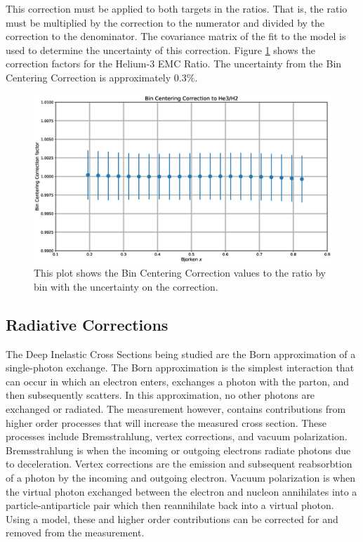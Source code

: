 This correction must be applied to both targets in the ratios. That is, the ratio must be multiplied by the correction to the numerator and divided by the correction to the denominator.\cite{wtsydp} The covariance matrix of the fit to the model is used to determine the uncertainty of this correction. Figure \ref{fig:bcc} shows the correction factors for the Helium-3 EMC Ratio. The uncertainty from the Bin Centering Correction is approximately $0.3\%$.

\begin{figure}
	\includegraphics[width=\textwidth]{./analysis/fig/bcc.eps}
	\caption{This plot shows the Bin Centering Correction values to the  ratio by bin with the uncertainty on the correction.}
	\label{fig:bcc}
\end{figure}

\subsection{Radiative Corrections}

The Deep Inelastic Cross Sections being studied are the Born approximation of a single-photon exchange. The Born approximation is the simplest interaction that can occur in which an electron enters, exchanges a photon with the parton, and then subsequently scatters. In this approximation, no other photons are exchanged or radiated. The measurement however, contains contributions from higher order processes that will increase the measured cross section. These processes include Bremsstrahlung, vertex corrections, and vacuum polarization. Bremsstrahlung is when the incoming or outgoing electrons radiate photons due to deceleration. Vertex corrections are the emission and subsequent reabsorbtion of a photon by the incoming and outgoing electron. Vacuum polarization is when the virtual photon exchanged between the electron and nucleon annihilates into a particle-antiparticle pair which then reannihilate back into a virtual photon. Using a model, these and higher order contributions can be corrected for and removed from the measurement.

